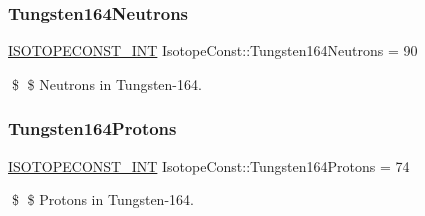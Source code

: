 \subsubsection{\texorpdfstring{Tungsten164\+Neutrons}{Tungsten164Neutrons}}
{\footnotesize\ttfamily \mbox{\hyperlink{group___isotope_const-_macros_ga5f18360b3e99483a35c32d789e62621c}{I\+S\+O\+T\+O\+P\+E\+C\+O\+N\+S\+T\+\_\+\+I\+NT}} Isotope\+Const\+::\+Tungsten164\+Neutrons = 90}

\$ \$ Neutrons in Tungsten-\/164. \mbox{\label{group___isotope_const-_tungsten-_w164_ga4042b74bd7a008c6cb7e9d9456008841}} 
\subsubsection{\texorpdfstring{Tungsten164\+Protons}{Tungsten164Protons}}
{\footnotesize\ttfamily \mbox{\hyperlink{group___isotope_const-_macros_ga5f18360b3e99483a35c32d789e62621c}{I\+S\+O\+T\+O\+P\+E\+C\+O\+N\+S\+T\+\_\+\+I\+NT}} Isotope\+Const\+::\+Tungsten164\+Protons = 74}

\$ \$ Protons in Tungsten-\/164. 